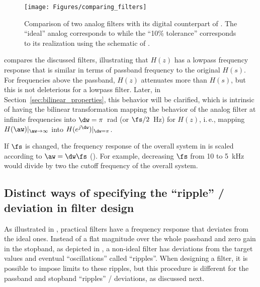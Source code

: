 \begin{figure}
\centering
\texttt{[image: Figures/comparing\_filters]}
\caption{Comparison of two analog filters with its digital counterpart of . The ``ideal'' analog corresponds to  while the ``10\% tolerance'' corresponds to its realization using the schematic of .\label{fig:comparing_filters}}
\end{figure}

 compares the discussed filters, illustrating that $H(z)$ has a lowpass frequency response that is similar in terms of passband frequency to the original $H(s)$. For frequencies above the passband, $H(z)$ attenuates more than $H(s)$, but this is not deleterious for a lowpass filter. Later, in Section~\ref{sec:bilinear_properties}, this behavior will be clarified, which is intrinsic of having the bilinear transformation mapping the behavior of the analog filter at infinite frequencies into $\dw=\pi$~rad (or $\fs/2$~Hz) for $H(z)$, i.\,e., mapping $H(\aw)|_{\aw \rightarrow \infty}$ into $H(e^{j\dw})|_{\dw = \pi}$.

If $\fs$ is changed, the frequency response of the overall system in  is scaled according to $\aw = \dw \fs$ (). For example, decreasing $\fs$ from 10 to 5~kHz would divide by two the cutoff frequency of the overall system.
\eExample 



\subsection{Distinct ways of specifying the ``ripple'' / deviation in filter design}
As illustrated in , practical filters have a frequency response that deviates from
the ideal ones. Instead of a flat magnitude over the whole passband and zero gain in the stopband,
as depicted in , a non-ideal filter has deviations from the target values
and eventual ``oscillations'' called ``ripples''.
When designing a filter, it is possible to impose limits to these ripples, but this procedure
is different for the passband and stopband ``ripples'' / deviations, as discussed next.

